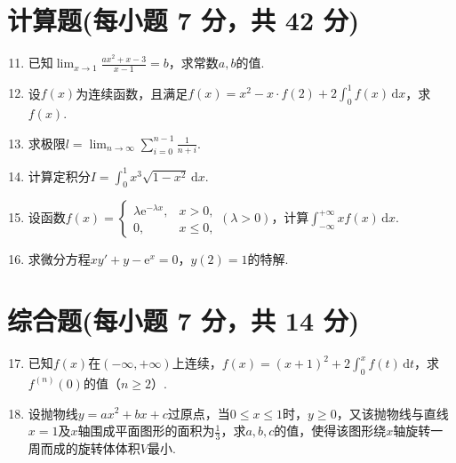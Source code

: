 \documentclass[../main.tex]{subfiles}
\begin{document}
\section{计算题(每小题 7 分，共 42 分)}
\begin{enumerate}
    \setcounter{enumi}{10}
    \item 已知$\lim_{x\to1}\frac{ax^{2}+x-3}{x-1}=b$，求常数$a,b$的值.
          \vspace{12em}

    \item 设$f(x)$为连续函数，且满足$f(x)=x^{2}-x\cdot f(2)+2\int_{0}^{1}f(x
              )\,\mathrm{d}x$，求$f(x)$.
          \vspace{11em}

    \item 求极限$l=\lim_{n\to\infty}\sum_{i=0}^{n-1}\frac{1}{n+i}$.
          \vspace{11em}

    \item 计算定积分$I=\int_{0}^{1}x^{3}\sqrt{1-x^{2}}\,\mathrm{d}x$.
          \vspace{11em}

    \item 设函数$f(x)=
              \begin{cases}
                  \lambda \mathrm{e}^{-\lambda x}, & x>0,    \\
                  0,                               & x\leq0,
              \end{cases}(\lambda>0)$，计算$\int_{-\infty}^{+\infty}xf(x)\,\mathrm{d}x$.
          \vspace{12em}

    \item 求微分方程$xy'+y-\mathrm{e}^{x}=0$，$y(2)=1$的特解.
          \vspace{12em}
\end{enumerate}

\section{综合题(每小题 7 分，共 14 分)}
\begin{enumerate}
    \setcounter{enumi}{16}
    \item 已知$f(x)$在$(-\infty,+\infty)$上连续，$f(x)=(x+1)^{2}+2\int_{0}^{x}
              f(t)\,\mathrm{d}t$，求$f^{(n)}(0)$的值（$n\geq2$）.
          \vspace{10em}

    \item 设抛物线$y=ax^{2}+bx+c$过原点，当$0\leq x\leq 1$时，$y\geq0$，又该抛物线与直线$x
              =1$及$x$轴围成平面图形的面积为$\frac{1}{3}$，求$a,b,c$的值，使得该图形绕$x$轴旋转一周而成的旋转体体积$V$最小.
          \vspace{10em}
\end{enumerate}
\end{document}

